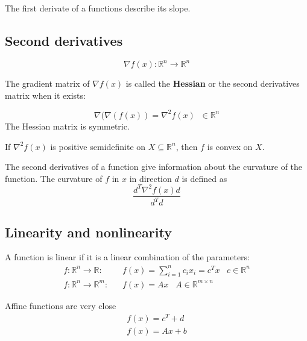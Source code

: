 The first derivate of a functions describe its slope.



\subsection{Second derivatives}
\begin{equation}
    \nabla f(x): \mathbb{R}^n\rightarrow\mathbb{R}^n
\end{equation}

The gradient matrix of $\nabla f(x)$ is called the \textbf{Hessian} or the second derivatives matrix when it exists:

\begin{equation}
    \nabla(\nabla(f(x))=\nabla^2f(x) \;\; \in \mathbb{R}^n
\end{equation}
The Hessian matrix is symmetric.

If $\nabla^2 f(x)$ is positive semidefinite on $X\subseteq\mathbb{R}^n$, then $f$ is convex on $X$.


The second derivatives of a function give information about the curvature of the function. The curvature of $f$ in $x$ in direction $d$ is defined as
\begin{equation}
    \frac{d^T\nabla^2 f(x)d}{d^Td}
\end{equation}

\subsection{Linearity and nonlinearity}

A function is linear if it is a linear combination of the parameters:
\begin{equation}
\begin{split}
    f: \mathbb{R}^n \rightarrow \mathbb{R}:&\;\;\; f(x) = \sum_{i=1}^n c_i x_i = c^T x \;\;\; c\in\mathbb{R}^n \\
    f: \mathbb{R}^n \rightarrow \mathbb{R}^m:&\;\;\; f(x) = Ax \;\;\; A\in\mathbb{R}^{m\times n}
\end{split}
\end{equation}

Affine functions are very close
\begin{equation}
\begin{split}
    f(x) = c^T+d \\
    f(x) = Ax+b
\end{split}
\end{equation}

